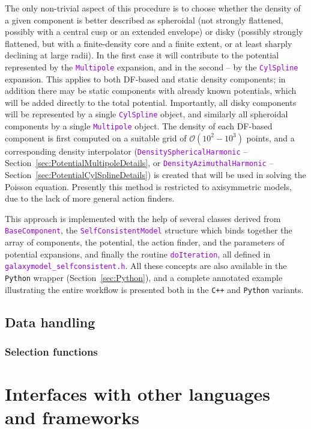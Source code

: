 \documentclass[12pt]{article}
\newcommand{\Cpp}  {\texttt{C++}\xspace}
\newcommand{\Python}{\texttt{Python}\xspace}
\newcommand{\ttt}[1]{\textcolor{darkviolet}{\texttt{#1}}}
\begin{document}
The only non-trivial aspect of this procedure is to choose whether the density of a given component is better described as spheroidal (not strongly flattened, possibly with a central cusp or an extended envelope) or disky (possibly strongly flattened, but with a finite-density core and a finite extent, or at least sharply declining at large radii). In the first case it will contribute to the potential represented by the \ttt{Multipole} expansion, and in the second -- by the \ttt{CylSpline} expansion. This applies to both DF-based and static density components; in addition there may be static components with already known potentials, which will be added directly to the total potential. Importantly, all disky components will be represented by a single \ttt{CylSpline} object, and similarly all spheroidal components by a single \ttt{Multipole} object.
The density of each DF-based component is first computed on a suitable grid of $\mathcal{O}(10^2-10^3)$ points, and a corresponding density interpolator (\ttt{DensitySphericalHarmonic} -- Section~\ref{sec:PotentialMultipoleDetails}, or \ttt{DensityAzimuthalHarmonic} -- Section~\ref{sec:PotentialCylSplineDetails}) is created that will be used in solving the Poisson equation. 
Presently this method is restricted to axisymmetric models, due to the lack of more general action finders.

This approach is implemented with the help of several classes derived from \ttt{BaseComponent}, the \ttt{SelfConsistentModel} structure which binds together the array of components, the potential, the action finder, and the parameters of potential expansions, and finally the routine \ttt{doIteration}, all defined in \ttt{galaxymodel_selfconsistent.h}. All these concepts are also available in the \Python wrapper (Section~\ref{sec:Python}), and a complete annotated example illustrating the entire workflow is presented both in the \Cpp and \Python variants.

\subsection{Data handling}
\subsubsection{Selection functions}

\section{Interfaces with other languages and frameworks}  \label{sec:Interfaces}
\end{document}

